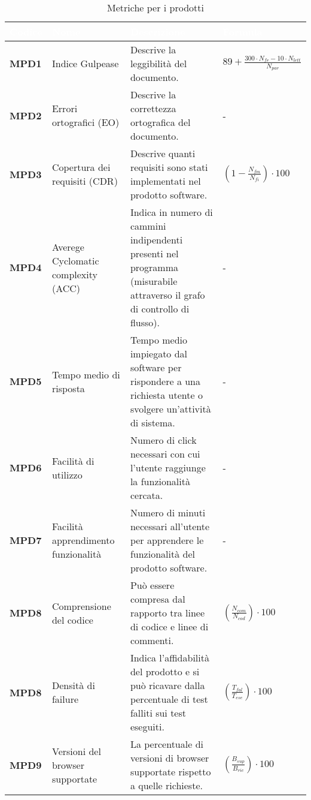 \begin{longtable}{C{1.5cm} C{4.5cm} C{5.5cm} C{5cm}}
		\textcolor{white}{\textbf{Codice}} & 
		\textcolor{white}{\textbf{Nome}} & 
		\textcolor{white}{\textbf{Descrizione}} & 
		\textcolor{white}{\textbf{Formula}} \\
		\endfirsthead
	    \endfoot
	    \caption{Metriche per i prodotti}
	    \endlastfoot
		\hline
		\textbf{MPD1} & 
		Indice Gulpease & 
		Descrive la leggibilità del documento. & 
		$ 89 + \frac{300 \cdot N_{fr} - 10 \cdot N_{lett}}{N_{par}}$ \\
		\textbf{MPD2} & 
		Errori ortografici (EO) & 
		Descrive la correttezza ortografica del documento. & 
		- \\
		\textbf{MPD3} & 
		Copertura dei requisiti (CDR) & 
		Descrive quanti requisiti sono stati implementati nel prodotto software. &
		$(1 - \frac{N_{fm}}{N_{fi}}) \cdot 100 $ \\
		\textbf{MPD4} & 
		Averege Cyclomatic complexity (ACC) & 
		Indica in numero di cammini indipendenti presenti nel programma (misurabile attraverso il grafo di controllo di flusso). &
		- \\
		\textbf{MPD5} & 
		Tempo medio di risposta & 
		Tempo medio impiegato dal software per rispondere a una richiesta utente o svolgere un'attività di sistema. &
		- \\
		\textbf{MPD6} & 
		Facilità di utilizzo & 
		Numero di click necessari con cui l'utente raggiunge la funzionalità cercata. &
		- \\
		\textbf{MPD7} & 
		Facilità apprendimento funzionalità & 
		Numero di minuti necessari all'utente per apprendere le funzionalità del prodotto software. &
		- \\
		\textbf{MPD8} & 
		Comprensione del codice & 
		Può essere compresa dal rapporto tra linee di codice e linee di commenti. &
		$(\frac{N_{com}}{N_{cod}}) \cdot 100 $ \\
		\textbf{MPD8} & 
		Densità di failure & 
		Indica l'affidabilità del prodotto e si può ricavare dalla percentuale di test falliti sui test eseguiti. &
		$(\frac{T_{fal}}{T_{ese}}) \cdot 100 $ \\
		\textbf{MPD9} & 
		Versioni del browser supportate & 
		La percentuale di versioni di browser supportate rispetto a quelle richieste. &
		$(\frac{B_{sup}}{B_{ric}}) \cdot 100 $  \\
\end{longtable}